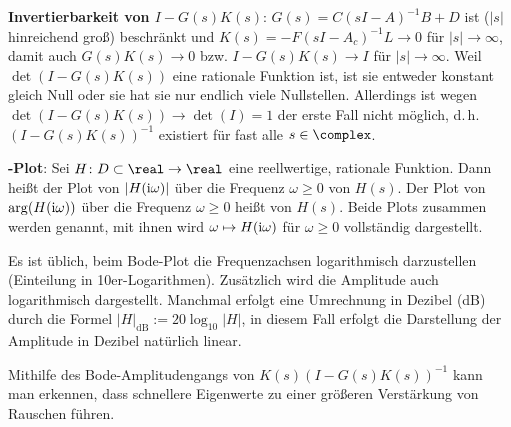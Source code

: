 \textbf{Invertierbarkeit von $I - G(s)K(s)$}:
$G(s) = C(sI - A)^{-1} B + D$ ist ($|s|$ hinreichend groß) beschränkt und
$K(s) = -F(sI - A_c)^{-1} L \to 0$ für $|s| \to \infty$,
damit auch $G(s)K(s) \to 0$ bzw. $I - G(s)K(s) \to I$ für $|s| \to \infty$.
Weil $\det(I - G(s)K(s))$ eine rationale Funktion ist, ist sie entweder konstant gleich Null
oder sie hat sie nur endlich viele Nullstellen.
Allerdings ist wegen $\det(I - G(s)K(s)) \to \det(I) = 1$ der erste Fall nicht möglich, d.\,h.
$(I - G(s)K(s))^{-1}$ existiert für fast alle $s \in \complex$.

\linie

\textbf{-Plot}:
Sei $H\colon D \subset \real \rightarrow \real$ eine reellwertige, rationale Funktion.
Dann heißt der Plot von $|H(\text{i}\omega)|$ über die Frequenz $\omega \ge 0$
 von $H(s)$.
Der Plot von $\arg(H(\text{i}\omega))$ über die Frequenz $\omega \ge 0$ heißt
 von $H(s)$.
Beide Plots zusammen werden  genannt,
mit ihnen wird $\omega \mapsto H(\text{i}\omega)$ für $\omega \ge 0$ vollständig dargestellt.

Es ist üblich, beim Bode-Plot die Frequenzachsen logarithmisch darzustellen
(Einteilung in 10er-Logarithmen).
Zusätzlich wird die Amplitude auch logarithmisch dargestellt.
Manchmal erfolgt eine Umrechnung in Dezibel (dB) durch die Formel
$|H|_{\text{dB}} := 20 \log_{10} |H|$,
in diesem Fall erfolgt die Darstellung der Amplitude in Dezibel natürlich linear.

Mithilfe des Bode-Amplitudengangs von $K(s) (I - G(s)K(s))^{-1}$
kann man erkennen, dass schnellere Eigenwerte zu einer größeren Verstärkung von Rauschen führen.

\pagebreak
{}
